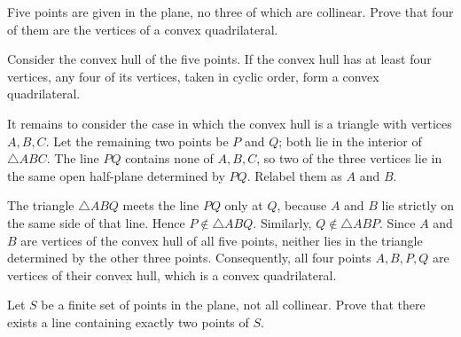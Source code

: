     \begin{expectedproblem}
        Five points are given in the plane, no three of which are collinear.
        Prove that four of them are the vertices of a convex quadrilateral.
    \end{expectedproblem}

    \begin{solution}
        Consider the convex hull of the five points. If the convex hull has at
        least four vertices, any four of its vertices, taken in cyclic order,
        form a convex quadrilateral.

        It remains to consider the case in which the convex hull is a triangle
        with vertices $A,B,C$. Let the remaining two points be $P$ and $Q$;
        both lie in the interior of $\triangle ABC$. The line $PQ$ contains none
        of $A,B,C$, so two of the three vertices lie in the same open half-plane
        determined by $PQ$. Relabel them as $A$ and $B$.

        The triangle $\triangle ABQ$ meets the line $PQ$ only at $Q$, because
        $A$ and $B$ lie strictly on the same side of that line. Hence
        $P\notin\triangle ABQ$. Similarly, $Q\notin\triangle ABP$. Since
        $A$ and $B$ are vertices of the convex hull of all five points, neither
        lies in the triangle determined by the other three points. Consequently,
        all four points $A,B,P,Q$ are vertices of their convex hull, which is a
        convex quadrilateral.
    \end{solution}

    \begin{expectedproblem}
        Let $S$ be a finite set of points in the plane, not all collinear. Prove
        that there exists a line containing exactly two points of $S$.
    \end{expectedproblem}

